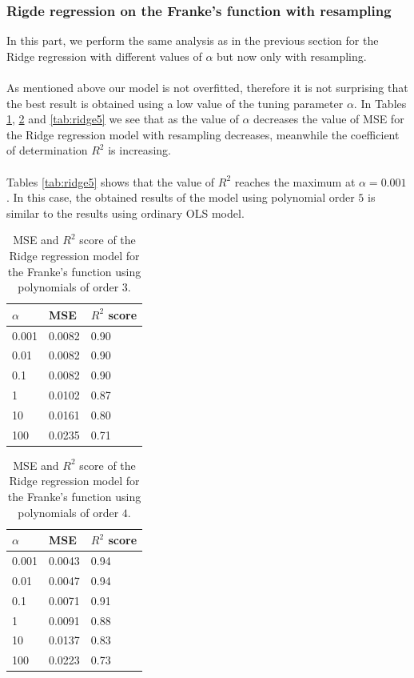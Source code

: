 \documentclass [11pt]{article}
\begin{document}
\subsubsection{Rigde regression on the Franke's function  with resampling}
In this part, we perform the same analysis as in the previous section for the Ridge regression with different values of $\alpha$ but now only with resampling.\\
\\
As mentioned above our model is not overfitted, therefore it is not surprising that the best result is obtained using a low value of the tuning parameter $\alpha$. In Tables \ref{tab:ridge3}, \ref{tab:ridge4} and \ref{tab:ridge5} we see that as the value of $\alpha$ decreases the value of MSE for the Ridge regression model with resampling decreases, meanwhile the coefficient of determination $R^{2}$ is increasing.\\
\\
Tables \ref{tab:ridge5} shows that the value of $R^{2}$ reaches the maximum at $\alpha=0.001$. In this case, the obtained results of the model using polynomial order $5$ is similar to the results using ordinary OLS model.
\begin{table}[H]
\centering
\begin{tabular}{lll}
\hline
$\alpha$ & MSE    & $R^{2}$ score \\ \hline
0.001     & 0.0082 & 0.90          \\
0.01      & 0.0082 & 0.90          \\
0.1       & 0.0082 & 0.90          \\
1         & 0.0102 & 0.87          \\
10        & 0.0161 & 0.80          \\
100       & 0.0235 & 0.71          \\ \hline
\end{tabular}
\caption{MSE and $R^{2}$ score of the Ridge regression model for the Franke's function using polynomials of order $3$.}
\label{tab:ridge3}
\end{table}

\begin{table}[H]
\centering
\begin{tabular}{lll}
\hline
$\alpha$ & MSE    & $R^{2}$ score \\ \hline
0.001     & 0.0043 & 0.94          \\
0.01      & 0.0047 & 0.94          \\
0.1       & 0.0071 & 0.91          \\
1         & 0.0091 & 0.88          \\
10        & 0.0137 & 0.83          \\
100       & 0.0223 & 0.73          \\ \hline
\end{tabular}
\caption{MSE and $R^{2}$ score of the Ridge regression model for the Franke's function using polynomials of order $4$.}
\label{tab:ridge4}
\end{table}
\end{document}
